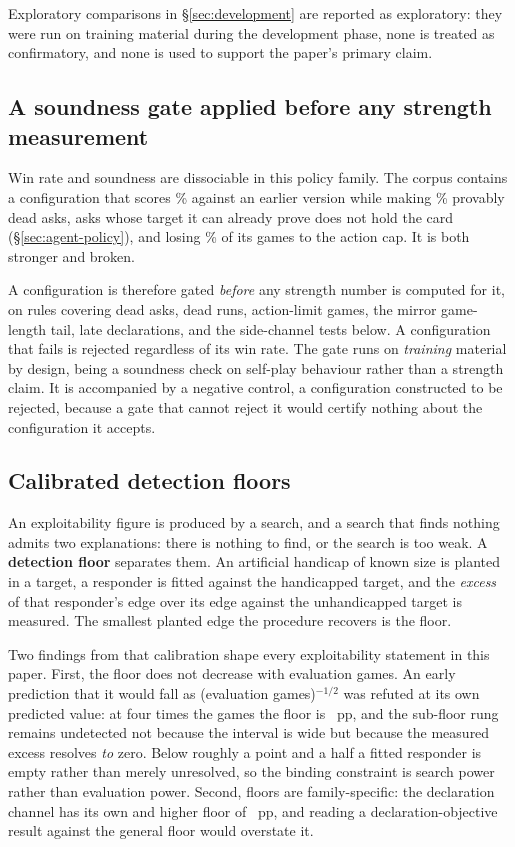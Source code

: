 Exploratory comparisons in \S\ref{sec:development} are reported as exploratory: they were run on
training material during the development phase, none is treated as confirmatory, and none is used to
support the paper's primary claim.

\subsection{A soundness gate applied before any strength measurement}
\label{sec:evaluation-gate}

Win rate and soundness are dissociable in this policy family. The corpus contains a configuration
that scores \vsevenScoreboardTrapWin\% against an earlier version while making
\vsevenScoreboardTrapDead\% provably dead asks, asks whose target it can already prove does not
hold the card (\S\ref{sec:agent-policy}), and losing \vsevenScoreboardTrapLimit\% of its games to the action cap. It is both stronger and
broken.

A configuration is therefore gated \emph{before} any strength number is computed for it, on \vsevenGateRulesWord{}
rules covering dead asks, dead runs, action-limit games, the mirror game-length tail, late
declarations, and the side-channel tests below. A configuration that fails is rejected regardless of
its win rate. The gate runs on \emph{training} material by design, being a soundness check on
self-play behaviour rather than a strength claim. It is accompanied by a negative control, a
configuration constructed to be rejected, because a gate that cannot reject it would certify nothing
about the configuration it accepts.

\subsection{Calibrated detection floors}
\label{sec:evaluation-floor}

An exploitability figure is produced by a search, and a search that finds nothing admits two
explanations: there is nothing to find, or the search is too weak. A \textbf{detection floor}
separates them. An artificial handicap of known size is planted in a target, a responder is fitted
against the handicapped target, and the \emph{excess} of that responder's edge over its edge against
the unhandicapped target is measured. The smallest planted edge the procedure recovers is the floor.

Two findings from that calibration shape every exploitability statement in this paper. First, the
floor does not decrease with evaluation games. An early prediction that it would fall as
(evaluation games)$^{-1/2}$ was refuted at its own predicted value: at four times the games the floor
is \vsevenPrimaryFloor{}~pp, and the sub-floor rung remains undetected not because the interval is
wide but because the measured excess resolves \emph{to} zero. Below roughly a point and a half a
fitted responder is empty rather than merely unresolved, so the binding constraint is search power
rather than evaluation power. Second, floors are family-specific: the declaration channel has its own
and higher floor of \vsevenDeclFloor{}~pp, and reading a declaration-objective result against the
general floor would overstate it.

